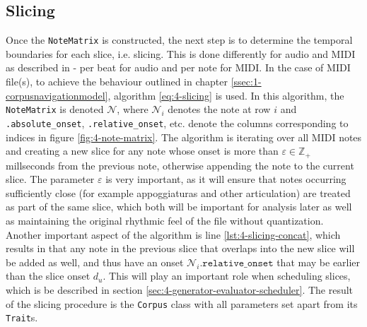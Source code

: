 \subsection{Slicing}\label{sec:4-corpus-builder-slicing}
Once the \texttt{NoteMatrix} is constructed, the next step is to determine the temporal boundaries for each slice, i.e. slicing. This is done differently for audio and MIDI as described in \cite{somaxtheory2021} - per beat for audio and per note for MIDI. In the case of MIDI file(s), to achieve the behaviour outlined in chapter \ref{ssec:1-corpusnavigationmodel}, algorithm \ref{eq:4-slicing} is used. In this algorithm, the \texttt{NoteMatrix} is denoted $\mathcal N$, where $\mathcal N_i$ denotes the note at row $i$ and \texttt{.absolute\_onset}, \texttt{.relative\_onset}, etc. denote the columns corresponding to indices in figure \ref{fig:4-note-matrix}. The algorithm is iterating over all MIDI notes and creating a new slice for any note whose onset is more than $\varepsilon \in \mathbb Z_+$ millseconds from the previous note, otherwise appending the note to the current slice. The parameter $\varepsilon$ is very important, as it will ensure that notes occurring sufficiently close (for example appoggiaturas and other articulation) are treated as part of the same slice, which both will be important for analysis later as well as maintaining the original rhythmic feel of the file without quantization. Another important aspect of the algorithm is line \ref{lst:4-slicing-concat}, which results in that any note in the previous slice that overlaps into the new slice will be added as well, and thus have an onset $\mathcal N_i\texttt{.relative\_onset}$ that may be earlier than the slice onset $d_u$. This will play an important role when scheduling slices, which is be described in section \ref{sec:4-generator-evaluator-scheduler}. The result of the slicing procedure is the \texttt{Corpus} class with all parameters set apart from its \texttt{Trait}s.

